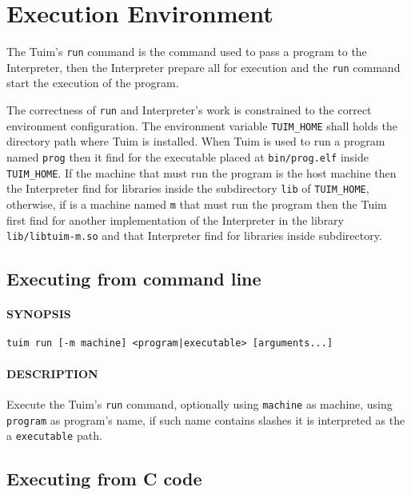 \chapter{Execution Environment}

The Tuim's \texttt{run} command is the command used to pass a program
to the Interpreter, then the Interpreter prepare all for execution and
the \texttt{run} command start the execution of the program.

The correctness of \texttt{run} and Interpreter's
work is constrained to the correct
environment configuration.
The environment variable \texttt{TUIM\_HOME}
shall holds the directory path where Tuim is installed.
When Tuim is used to run a program named \texttt{prog} then it find
for the executable placed at \texttt{bin/prog.elf} inside \texttt{TUIM\_HOME}.
If the machine that must run the program is the host machine
then the Interpreter find for libraries inside the subdirectory
\texttt{lib} of \texttt{TUIM\_HOME},
otherwise, if is a machine named \texttt{m} that must run the program then
the Tuim first find for another implementation of the Interpreter
in the library \texttt{lib/libtuim-m.so} and that Interpreter find for libraries
inside  subdirectory.

\section{Executing from command line}

\subsubsection*{SYNOPSIS}

\begin{lstlisting}[style=bash]
tuim run [-m machine] <program|executable> [arguments...]
\end{lstlisting}

\subsubsection*{DESCRIPTION}

Execute the Tuim's \texttt{run} command,
optionally using \texttt{machine} as machine,
using \texttt{program} as program's name,
if such name contains slashes
it is interpreted as the a \texttt{executable} path.

\section{Executing from C code}

